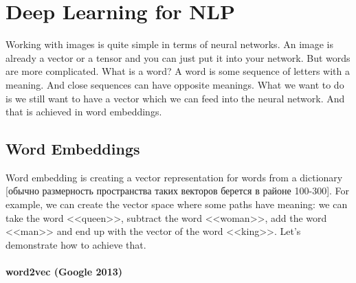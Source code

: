 \chapter{Deep Learning for NLP}

{\sf Working with images is quite simple in terms of neural networks. An image is already a vector or a tensor and you can just put it into your network. But words are more complicated. What is a word? A word is some sequence of letters with a meaning. And close sequences can have opposite meanings. What we want to do is we still want to have a vector which we can feed into the neural network. And that is achieved in word embeddings.}

\section{Word Embeddings}

Word embedding is creating a vector representation for words from a dictionary [обычно размерность пространства таких векторов берется в районе 100-300]. For example, we can create the vector space where some paths have meaning: we can take the word <<queen>>, subtract the word <<woman>>, add the word <<man>> and end up with the vector of the word <<king>>. Let's demonstrate how to achieve that.

\subsubsection*{word2vec (Google 2013)}

